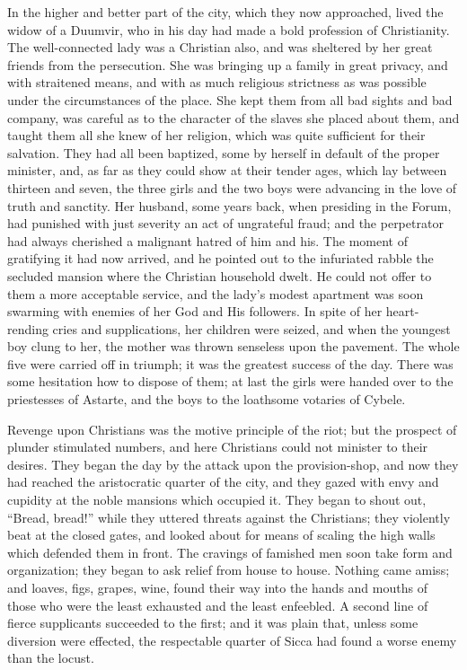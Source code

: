 In the higher and better part of the city, which they now
approached, lived the widow of a Duumvir, who in his day had made a
bold profession of Christianity. The well-connected lady was a
Christian also, and was sheltered by her great friends from the
persecution. She was bringing up a family in great privacy, and with
straitened means, and with as much religious strictness as was
possible under the circumstances of the place. She kept them from all
bad sights and bad company, was careful as to the character of the
slaves she placed about them, and taught them all she knew of her
religion, which was quite sufficient for their salvation. They had all
been baptized, some by herself in default of the proper minister, and,
as far as they could show at their tender ages, which lay between
thirteen and seven, the three girls and the two boys were advancing in
the love of truth and sanctity. Her husband, some years back, when
presiding in the Forum, had punished with just severity an act of
ungrateful fraud; and the perpetrator had always cherished a malignant
hatred of him and his. The moment of gratifying it had now arrived,
and he pointed out to the infuriated rabble the secluded mansion where
the Christian household dwelt. He could not offer to them a more
acceptable service, and the lady's modest apartment was soon swarming
with enemies of her God and His followers. In spite of her
heart-rending cries and supplications, her children were seized, and
when the youngest boy clung to her, the mother was thrown senseless
upon the pavement. The whole five were carried off in triumph; it was
the greatest success of the day. There was some hesitation how
to dispose of them; at last the girls were handed over to the
priestesses of Astarte, and the boys to the loathsome votaries of
Cybele.

Revenge upon Christians was the motive principle of the riot; but
the prospect of plunder stimulated numbers, and here Christians could
not minister to their desires. They began the day by the attack upon
the provision-shop, and now they had reached the aristocratic quarter
of the city, and they gazed with envy and cupidity at the noble
mansions which occupied it. They began to shout out, ``Bread,
bread!'' while they uttered threats against the Christians; they
violently beat at the closed gates, and looked about for means of
scaling the high walls which defended them in front. The cravings of
famished men soon take form and organization; they began to ask relief
from house to house. Nothing came amiss; and loaves, figs, grapes,
wine, found their way into the hands and mouths of those who were the
least exhausted and the least enfeebled. A second line of fierce
supplicants succeeded to the first; and it was plain that, unless some
diversion were effected, the respectable quarter of Sicca had found a
worse enemy than the locust.

